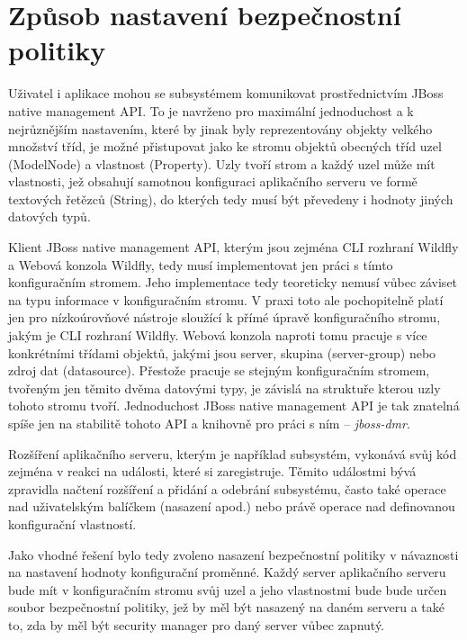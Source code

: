 \section{Způsob nastavení bezpečnostní politiky}

Uživatel i aplikace mohou se subsystémem komunikovat prostřednictvím JBoss native management API. To je navrženo pro maximální jednoduchost a k nejrůznějším nastavením, které by jinak byly reprezentovány objekty velkého množství tříd, je možné přistupovat jako ke stromu objektů obecných tříd uzel (ModelNode) a vlastnost (Property). Uzly tvoří strom a každý uzel může mít vlastnosti, jež obsahují samotnou konfiguraci aplikačního serveru ve formě textových řetězců (String), do kterých tedy musí být převedeny i hodnoty jiných datových typů. \cite{jbossDetypedManagement}

Klient JBoss native management API, kterým jsou zejména CLI rozhraní Wildfly a Webová konzola Wildfly, tedy musí implementovat jen práci s tímto konfiguračním stromem. Jeho implementace tedy teoreticky nemusí vůbec záviset na typu informace v konfiguračním stromu. V praxi toto ale pochopitelně platí jen pro nízkoúrovňové nástroje sloužící k přímé úpravě konfiguračního stromu, jakým je CLI rozhraní Wildfly. Webová konzola naproti tomu pracuje s více konkrétními třídami objektů, jakými jsou server, skupina (server-group) nebo zdroj dat (datasource). Přestože pracuje se stejným konfiguračním stromem, tvořeným jen těmito dvěma datovými typy, je závislá na struktuře kterou uzly tohoto stromu tvoří. Jednoduchost JBoss native management API je tak znatelná spíše jen na stabilitě tohoto API a knihovně pro práci s ním -- {\it jboss-dmr}. \cite{jbossDetypedManagement}

Rozšíření aplikačního serveru, kterým je například subsystém, vykonává svůj kód zejména v reakci na události, které si zaregistruje. Těmito událostmi bývá zpravidla načtení rozšíření a přidání a odebrání subsystému, často také operace nad uživatelským balíčkem (nasazení apod.) nebo právě operace nad definovanou konfigurační vlastností. \cite{jbossExtending}

Jako vhodné řešení bylo tedy zvoleno nasazení bezpečnostní politiky v návaznosti na nastavení hodnoty konfigurační proměnné. Každý server aplikačního serveru bude mít v konfiguračním stromu svůj uzel a jeho vlastnostmi bude bude určen soubor bezpečnostní politiky, jež by měl být nasazený na daném serveru a také to, zda by měl být security manager pro daný server vůbec zapnutý.

